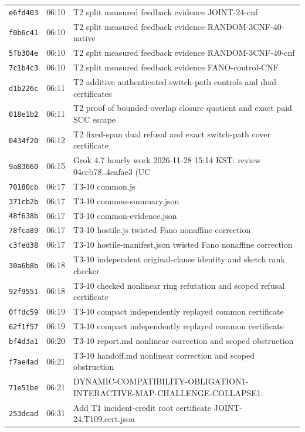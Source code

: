 \documentclass[11pt]{article}
\theoremstyle{definition}
\theoremstyle{remark}
\begin{document}
\begin{longtable}{llp{11.5cm}}
\texttt{e6fd403} & 06:10 & T2 split measured feedback evidence JOINT-24-cnf\\
\texttt{f0b6c41} & 06:10 & T2 split measured feedback evidence RANDOM-3CNF-40-native\\
\texttt{5fb304e} & 06:10 & T2 split measured feedback evidence RANDOM-3CNF-40-cnf\\
\texttt{7c1b4c3} & 06:10 & T2 split measured feedback evidence FANO-control-CNF\\
\texttt{d1b226c} & 06:11 & T2 additive authenticated switch-path controls and dual certificates\\
\texttt{018e1b2} & 06:11 & T2 proof of bounded-overlap closure quotient and exact paid SCC escape\\
\texttt{0434f20} & 06:12 & T2 fixed-span dual refusal and exact switch-path cover certificate\\
\texttt{9a83660} & 06:15 & Grok 4.7 hourly work 2026-11-28 15:14 KST: review 04ccb78..4eafae3 (UC\\
\texttt{70180cb} & 06:17 & T3-10 common.js\\
\texttt{371cb2b} & 06:17 & T3-10 common-summary.json\\
\texttt{48f638b} & 06:17 & T3-10 common-evidence.json\\
\texttt{78fca89} & 06:17 & T3-10 hostile.js twisted Fano nonaffine correction\\
\texttt{c3fed38} & 06:17 & T3-10 hostile-manifest.json twisted Fano nonaffine correction\\
\texttt{30a6b8b} & 06:18 & T3-10 independent original-clause identity and sketch rank checker\\
\texttt{92f9551} & 06:18 & T3-10 checked nonlinear ring refutation and scoped refusal certificate\\
\texttt{0ffdc59} & 06:19 & T3-10 compact independently replayed common certificate\\
\texttt{62f1f57} & 06:19 & T3-10 compact independently replayed common certificate\\
\texttt{bf4d3a1} & 06:20 & T3-10 report.md nonlinear correction and scoped obstruction\\
\texttt{f7ae4ad} & 06:21 & T3-10 handoff.md nonlinear correction and scoped obstruction\\
\texttt{71e51be} & 06:21 & DYNAMIC-COMPATIBILITY-OBLIGATION1-INTERACTIVE-MAP-CHALLENGE-COLLAPSE1:\\
\texttt{253dcad} & 06:31 & Add T1 incident-credit root certificate JOINT-24.T109.cert.json\\

\end{longtable}
\end{document}
